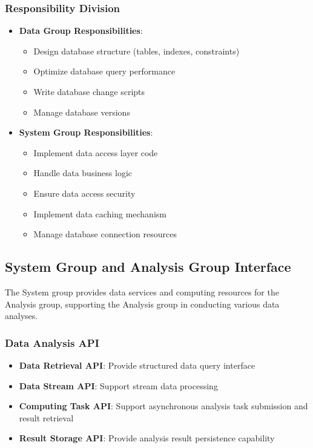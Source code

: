 \documentclass[a4paper,12pt]{article}
\begin{document}
\subsubsection{Responsibility Division}

\begin{itemize}
  \item \textbf{Data Group Responsibilities}:
  \begin{itemize}
    \item Design database structure (tables, indexes, constraints)
    \item Optimize database query performance
    \item Write database change scripts
    \item Manage database versions
  \end{itemize}
  
  \item \textbf{System Group Responsibilities}:
  \begin{itemize}
    \item Implement data access layer code
    \item Handle data business logic
    \item Ensure data access security
    \item Implement data caching mechanism
    \item Manage database connection resources
  \end{itemize}
\end{itemize}

\subsection{System Group and Analysis Group Interface}

The System group provides data services and computing resources for the Analysis group, supporting the Analysis group in conducting various data analyses.

\subsubsection{Data Analysis API}

\begin{itemize}
  \item \textbf{Data Retrieval API}: Provide structured data query interface
  \item \textbf{Data Stream API}: Support stream data processing
  \item \textbf{Computing Task API}: Support asynchronous analysis task submission and result retrieval
  \item \textbf{Result Storage API}: Provide analysis result persistence capability
\end{itemize}
\end{document}
